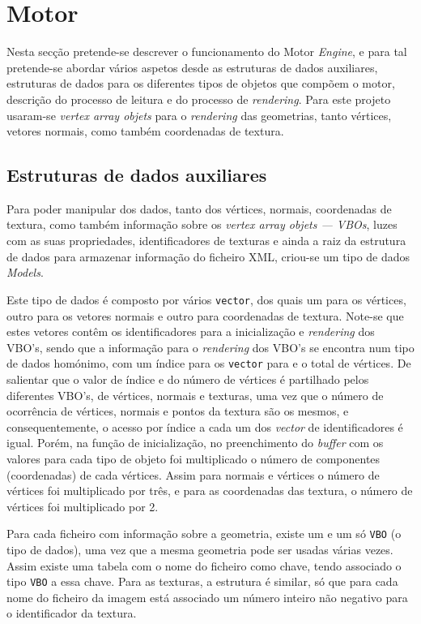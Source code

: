 \section{Motor}

Nesta secção pretende-se descrever o funcionamento do Motor \emph{Engine},
e para tal pretende-se abordar vários aspetos desde as estruturas de dados
auxiliares, estruturas de dados para os diferentes tipos de objetos que compõem
o motor, descrição do processo de leitura e do processo de \emph{rendering}.
Para este projeto usaram-se \emph{vertex array objets} para o \emph{rendering}
das geometrias, tanto vértices, vetores normais, como também coordenadas de
textura.


\subsection{Estruturas de dados auxiliares}


Para poder manipular dos dados, tanto dos vértices, normais, coordenadas de
textura, como também informação sobre os \emph{vertex array objets --- VBOs},
luzes com as suas propriedades, identificadores de texturas e ainda a raiz da
estrutura de dados para armazenar informação do ficheiro XML, criou-se um tipo
de dados \emph{Models}. 

Este tipo de dados é composto por vários \texttt{vector}, dos quais um para os
vértices, outro para os vetores normais e outro para coordenadas de textura.
Note-se que estes vetores contêm os identificadores para a inicialização
e \emph{rendering} dos VBO's, sendo que a informação para o \emph{rendering} dos
VBO's se encontra num tipo de dados homónimo, com um índice para os
\texttt{vector} para e o total de vértices. De salientar que o valor de índice
e do número de vértices é partilhado pelos diferentes VBO's, de vértices,
normais e texturas, uma vez que o número de ocorrência de vértices, normais
e pontos da textura são os mesmos, e consequentemente, o acesso por índice
a cada um dos \emph{vector} de identificadores é igual. Porém, na função de
inicialização, no preenchimento do \emph{buffer} com os valores para cada tipo
de objeto foi multiplicado o número de componentes (coordenadas) de cada
vértices. Assim para normais e vértices o número de vértices foi multiplicado
por três, e para as coordenadas das textura, o número de vértices foi
multiplicado por 2.

Para cada ficheiro com informação sobre a geometria, existe um e um só
\texttt{VBO} (o tipo de dados), uma vez que a mesma geometria pode ser usadas
várias vezes. Assim existe uma tabela com o nome do ficheiro como chave, tendo
associado o tipo \texttt{VBO} a essa chave. Para as texturas, a estrutura
é similar, só que para cada nome do ficheiro da imagem está associado um número
inteiro não negativo para o identificador da textura. 

